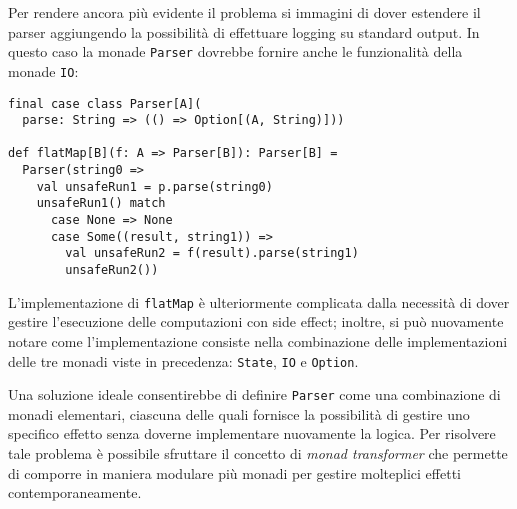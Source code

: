 Per rendere ancora più evidente il problema si immagini di dover estendere il parser aggiungendo la possibilità di effettuare logging su standard output. In questo caso la monade \lstinline{Parser} dovrebbe fornire anche le funzionalità della monade \lstinline{IO}:
\begin{lstlisting}[language=scala3]
final case class Parser[A](
  parse: String => (() => Option[(A, String)]))

def flatMap[B](f: A => Parser[B]): Parser[B] = 
  Parser(string0 => 
    val unsafeRun1 = p.parse(string0)
    unsafeRun1() match
      case None => None
      case Some((result, string1)) =>
        val unsafeRun2 = f(result).parse(string1)
        unsafeRun2())
\end{lstlisting}
L'implementazione di \lstinline{flatMap} è ulteriormente complicata dalla necessità di dover gestire l'esecuzione delle computazioni con side effect; inoltre, si può nuovamente notare come l'implementazione consiste nella combinazione delle implementazioni delle tre monadi viste in precedenza: \lstinline{State}, \lstinline{IO} e \lstinline{Option}.

Una soluzione ideale consentirebbe di definire \lstinline{Parser} come una combinazione di monadi elementari, ciascuna delle quali fornisce la possibilità di gestire uno specifico effetto senza doverne implementare nuovamente la logica. Per risolvere tale problema è possibile sfruttare il concetto di \emph{monad transformer} che permette di comporre in maniera modulare più monadi per gestire molteplici effetti contemporaneamente.

